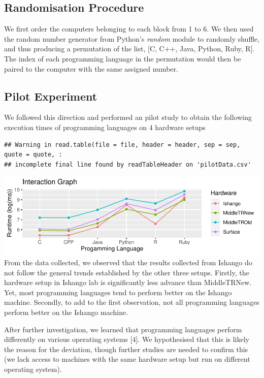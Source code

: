 \documentclass[12pt,halfline,a4paper,]{ouparticle}
\begin{document}
\hypertarget{randomisation-procedure}{%
\subsection{Randomisation Procedure}\label{randomisation-procedure}}

We first order the computers belonging to each block from 1 to 6. We
then used the random number generator from Python's \emph{random} module
to randomly shuffle, and thus producing a permutation of the list, {[}C,
C++, Java, Python, Ruby, R{]}. The index of each programming language in
the permutation would then be paired to the computer with the same
assigned number.

\hypertarget{pilot-experiment}{%
\subsection{Pilot Experiment}\label{pilot-experiment}}

We followed this direction and performed an pilot study to obtain the
following execution times of programming languages on 4 hardware setups

\begin{verbatim}
## Warning in read.table(file = file, header = header, sep = sep, quote = quote, :
## incomplete final line found by readTableHeader on 'pilotData.csv'
\end{verbatim}

\includegraphics[width=1\linewidth]{skeleton_files/figure-latex/figPilot-1}
From the data collected, we observed that the results collected from
Ishango do not follow the general trends established by the other three
setups. Firstly, the hardware setup in Ishango lab is significantly less
advance than MiddleTRNew. Yet, most programming languages tend to
perform better on the Ishango machine. Secondly, to add to the first
observation, not all programming languages perform better on the Ishango
machine.

After further investigation, we learned that programming languages
perform differently on various operating systems {[}4{]}. We
hypothesised that this is likely the reason for the deviation, though
further studies are needed to confirm this (we lack access to machines
with the same hardware setup but run on different operating system).
\end{document}
